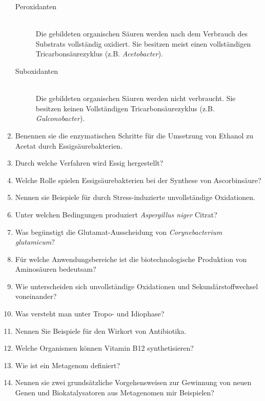 \begin{enumerate}
		\begin{description}
			\item[Peroxidanten] \hfill \\
				Die gebildeten organischen Säuren werden nach dem Verbrauch des Substrats vollständig oxidiert.
				Sie besitzen meist einen vollständigen Tricarbonsäurezyklus (z.B. \emph{Acetobacter}).
			\item[Suboxidanten] \hfill \\
				Die gebildeten organischen Säuren werden nicht verbraucht.
				Sie besitzen keinen Vollständigen Tricarbonsäurezyklus (z.B. \emph{Gulconobacter}).
		\end{description}
		
	\item Benennen sie die enzymatischen Schritte für die Umsetzung von Ethanol zu Acetat durch Essigsäurebakterien.
	\item Durch welche Verfahren wird Essig hergestellt?
	\item Welche Rolle spielen Essigsäurebakterien bei der Synthese von Ascorbinsäure?
	\item Nennen sie Beispiele für durch Stress-induzierte unvollständige Oxidationen.
	\item Unter welchen Bedingungen produziert \emph{Aspergillus niger} Citrat?
	\item Was begünstigt die Glutamat-Ausscheidung von \emph{Corynebacterium glutamicum}?
	\item Für welche Anwendungsbereiche ist die biotechnologische Produktion von Aminosäuren bedeutsam?
	\item Wie unterscheiden sich unvollständige Oxidationen und Sekundärstoffwechsel voneinander?
	\item Was versteht man unter Tropo- und Idiophase?
	\item Nennen Sie Beispiele für den Wirkort von Antibiotika.
	\item Welche Organismen können Vitamin B12 synthetisieren?
	\item Wie ist ein Metagenom definiert?
	\item Nennen sie zwei grundsätzliche Vorgehensweisen zur Gewinnung von neuen Genen und Biokatalysatoren aus Metagenomen mir Beispielen?
\end{enumerate}
